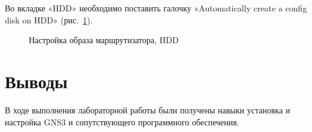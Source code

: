\documentclass[
  english,
  russian,
  12pt,
  a4paper,
  DIV=11,
  numbers=noendperiod]{scrreprt}
\begin{document}
Во вкладке «HDD» необходимо поставить галочку «Automatically create a
config disk on HDD» (рис.~\ref{fig-028}).

\begin{figure}


\caption{\label{fig-028}Настройка образа маршрутизатора, HDD}

\end{figure}%

\chapter{Выводы}\label{ux432ux44bux432ux43eux434ux44b}

В ходе выполнения лабораторной работы были получены навыки установка и
настройка GNS3 и сопутствующего программного обеспечения.


\printbibliography
\end{document}
